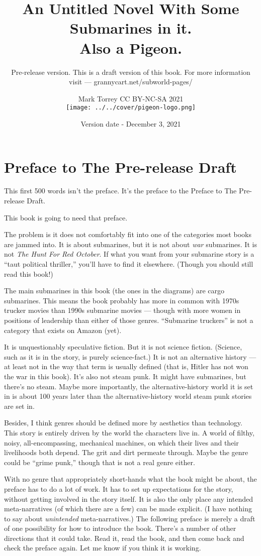 \documentclass[]{scrbook}
\title{An Untitled Novel With Some Submarines in it.\\ Also a Pigeon.}
\subtitle{Pre-release version. This is a draft version of this book. For more
information visit --- grannycart.net/subworld-pages/}
\author{Mark Torrey CC BY-NC-SA 2021\\[5mm] \texttt{[image: ../../cover/pigeon-logo.png]}}
\date{Version date - December 3, 2021}
\begin{document}
\maketitle

\small
\hypertarget{preface-to-the-pre-release-draft}{%
\chapter*{Preface to The Pre-release
Draft}\label{preface-to-the-pre-release-draft}}

This first 500 words isn't the preface. It's the preface to the Preface
to The Pre-release Draft.

This book is going to need that preface.

The problem is it does not comfortably fit into one of the categories
most books are jammed into. It is about submarines, but it is not about
\emph{war} submarines. It is not \emph{The Hunt For Red October}. If
what you want from your submarine story is a ``taut political
thriller,'' you'll have to find it elsewhere. (Though you should still
read this book!)

The main submarines in this book (the ones in the diagrams) are cargo
submarines. This means the book probably has more in common with 1970s trucker
movies than 1990s submarine movies --- though with more women in positions of
leadership than either of those genres. ``Submarine truckers'' is not a
category that exists on Amazon (yet).

It is unquestionably speculative fiction. But it is not science fiction.
(Science, such as it is in the story, is purely science-fact.) It is not
an alternative history --- at least not in the way that term is usually
defined (that is, Hitler has not won the war in this book). It's also
not steam punk. It might have submarines, but there's no steam. Maybe
more importantly, the alternative-history world it is set in is about
100 years later than the alternative-history world steam punk stories
are set in.

Besides, I think genres should be defined more by aesthetics than
technology. This story is entirely driven by the world the characters
live in. A world of filthy, noisy, all-encompassing, mechanical
machines, on which their lives and their livelihoods both depend. The
grit and dirt permeate through. Maybe the genre could be ``grime punk,''
though that is not a real genre either.

With no genre that appropriately short-hands what the book might be
about, the preface has to do a lot of work. It has to set up
expectations for the story, without getting involved in the story
itself. It is also the only place any intended meta-narratives (of which
there are a few) can be made explicit. (I have nothing to say about
\emph{unintended} meta-narratives.) The following preface is merely a
draft of one possibility for how to introduce the book. There's a number
of other directions that it could take. Read it, read the book, and then
come back and check the preface again. Let me know if you think it is
working.
\end{document}
